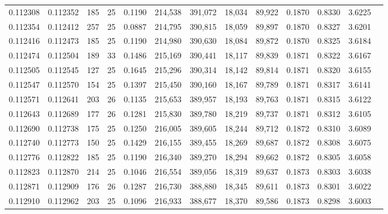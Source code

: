 \begin{tabular}{rrrrrrrrrrrrr}
0.112308 & 0.112352 & 185 &  25 &                                     0.1190 & 214,538 & 391,072 &  18,034 &  89,922 & 0.1870 & 0.8330 & 3.6225 \\
0.112354 & 0.112412 & 257 &  25 &                                     0.0887 & 214,795 & 390,815 &  18,059 &  89,897 & 0.1870 & 0.8327 & 3.6201 \\
0.112416 & 0.112473 & 185 &  25 &                                     0.1190 & 214,980 & 390,630 &  18,084 &  89,872 & 0.1870 & 0.8325 & 3.6184 \\
0.112474 & 0.112504 & 189 &  33 &                                     0.1486 & 215,169 & 390,441 &  18,117 &  89,839 & 0.1871 & 0.8322 & 3.6167 \\
0.112505 & 0.112545 & 127 &  25 &                                     0.1645 & 215,296 & 390,314 &  18,142 &  89,814 & 0.1871 & 0.8320 & 3.6155 \\
0.112547 & 0.112570 & 154 &  25 &                                     0.1397 & 215,450 & 390,160 &  18,167 &  89,789 & 0.1871 & 0.8317 & 3.6141 \\
0.112571 & 0.112641 & 203 &  26 &                                     0.1135 & 215,653 & 389,957 &  18,193 &  89,763 & 0.1871 & 0.8315 & 3.6122 \\
0.112643 & 0.112689 & 177 &  26 &                                     0.1281 & 215,830 & 389,780 &  18,219 &  89,737 & 0.1871 & 0.8312 & 3.6105 \\
0.112690 & 0.112738 & 175 &  25 &                                     0.1250 & 216,005 & 389,605 &  18,244 &  89,712 & 0.1872 & 0.8310 & 3.6089 \\
0.112740 & 0.112773 & 150 &  25 &                                     0.1429 & 216,155 & 389,455 &  18,269 &  89,687 & 0.1872 & 0.8308 & 3.6075 \\
0.112776 & 0.112822 & 185 &  25 &                                     0.1190 & 216,340 & 389,270 &  18,294 &  89,662 & 0.1872 & 0.8305 & 3.6058 \\
0.112823 & 0.112870 & 214 &  25 &                                     0.1046 & 216,554 & 389,056 &  18,319 &  89,637 & 0.1873 & 0.8303 & 3.6038 \\
0.112871 & 0.112909 & 176 &  26 &                                     0.1287 & 216,730 & 388,880 &  18,345 &  89,611 & 0.1873 & 0.8301 & 3.6022 \\
0.112910 & 0.112962 & 203 &  25 &                                     0.1096 & 216,933 & 388,677 &  18,370 &  89,586 & 0.1873 & 0.8298 & 3.6003 \\

\end{tabular}
